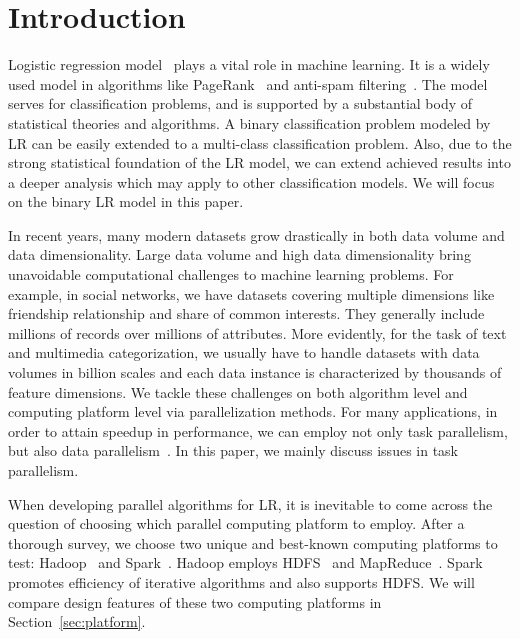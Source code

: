 \documentclass[10pt, conference, compsocconf]{IEEEtran}
\begin{document}
\section{Introduction} \label{sec:int}
Logistic regression model~\cite{HastieBook:SL} plays a vital role in machine learning.
It is a widely used model in algorithms like PageRank~\cite{page1999pagerank} and anti-spam filtering~\cite{androutsopoulos2000evaluation}.
The model serves for classification problems, and is supported by a substantial body of statistical theories and algorithms.
A binary classification problem modeled by LR can be easily extended to a multi-class classification problem.
Also, due to the strong statistical foundation of the LR model, we can extend achieved results into a deeper analysis which may apply to other classification models. We will focus on the binary LR model in this paper.

In recent years, many modern datasets grow drastically in both data volume and data dimensionality.
Large data volume and high data dimensionality bring unavoidable computational challenges to machine learning problems.
For example, in social networks, we have datasets covering multiple dimensions like friendship relationship and share of common interests. They generally include millions of records over millions of attributes. More evidently, for the task of text and multimedia categorization, we usually have to handle datasets with data volumes in billion scales and each data instance is characterized by thousands of feature dimensions.
We tackle these challenges on both algorithm level and computing platform level via parallelization methods.
For many applications, in order to attain speedup in performance, we can employ not only task parallelism, but also data parallelism~\cite{subhlok1993exploiting}.
In this paper, we mainly discuss issues in task parallelism.

When developing parallel algorithms for LR, it is inevitable to come across the question of choosing which parallel computing platform to employ.
After a thorough survey, we choose two unique and best-known computing platforms to test: Hadoop~\cite{white2012hadoop} and Spark~\cite{zaharia2010spark}.
Hadoop employs HDFS~\cite{borthakur2008hdfs} and MapReduce~\cite{dean2008mapreduce}.
Spark promotes efficiency of iterative algorithms and also supports HDFS.
We will compare design features of these two computing platforms in Section~\ref{sec:platform}.
\end{document}
